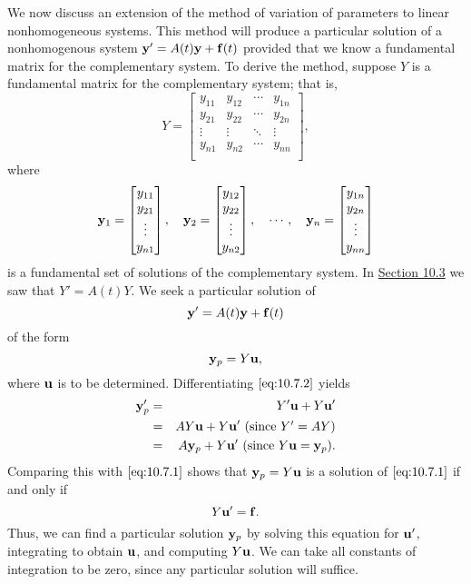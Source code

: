 \documentclass{ximera}
\begin{document}
We now discuss an extension of the method of variation of parameters
to linear nonhomogeneous systems. This method will produce a
particular solution of a nonhomogenous system ${\bf y}'=A(t){\bf y}+{\bf f}(t)$ provided that we know a fundamental matrix for the
complementary system. To derive the method, suppose $Y$ is a
fundamental matrix for the complementary system; that is,
$$
Y=\begin{bmatrix}
y_{11}&y_{12}&\cdots&y_{1n} \\
y_{21}&y_{22}&\cdots&y_{2n}\\
\vdots&\vdots&\ddots&\vdots \\
y_{n1}&y_{n2}&\cdots&y_{nn} \\
\end{bmatrix},
$$
where
$$
{\bf y}_1=\begin{bmatrix}y_{11}\\y_{21}\\ \vdots\\
y_{n1}\end{bmatrix},\quad
{\bf y}_2=\begin{bmatrix}y_{12}\\y_{22}\\ \vdots\\
y_{n2}\end{bmatrix},\quad \cdots,\quad
{\bf y}_n=\begin{bmatrix}y_{1n}\\y_{2n}\\ \vdots\\
y_{nn}\end{bmatrix}
$$
is a fundamental set of solutions of the complementary system.
In \href{https://xerxes.ximera.org/differentialequations/main/homogeneousLinearSys/homogeneousLinearSys}{Section 10.3} we saw that $Y'=A(t)Y$. We seek a
particular solution of
\begin{equation} \label{eq:10.7.1}
{\bf y}'=A(t){\bf y}+{\bf f}(t)
\end{equation}
 of the form
\begin{equation} \label{eq:10.7.2}
{\bf y}_p=Y{\bf u},
\end{equation}
 where ${\bf u}$ is to be determined. Differentiating $\eqref{eq:10.7.2}$ yields
\begin{eqnarray*}
 {\bf y}_p'&=&Y' {\bf u}+Y {\bf u}'
\\&=&A Y {\bf u}+Y {\bf u}'\mbox{ (since $Y'=AY$)}\\&=&
 A{\bf y}_p+Y {\bf u}'\mbox{ (since $Y{\bf u}={\bf y}_p$)}.
\end{eqnarray*}
Comparing this with  $\eqref{eq:10.7.1}$ shows that ${\bf y}_p=Y{\bf u}$ is a
solution of $\eqref{eq:10.7.1}$ if and only if
$$
Y{\bf u}'={\bf f}.
$$
Thus, we can find a particular solution ${\bf y}_p$ by solving this
equation for ${\bf u}'$, integrating to obtain ${\bf u}$, and
computing $Y{\bf u}$. We can take all constants of integration to be
zero, since any particular solution will suffice.
\end{document}
